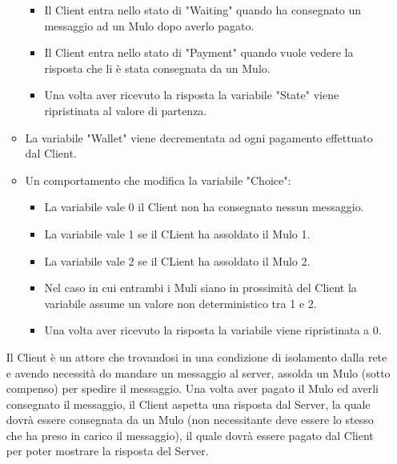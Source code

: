 \documentclass[13pt,a4paper]{article}
\begin{document}
\begin{itemize}
\begin{itemize}
\begin{itemize}
							\item Il Client entra nello stato di "Waiting" quando ha consegnato un messaggio ad un Mulo dopo averlo pagato. 
							\item Il Client entra nello stato di "Payment" quando vuole vedere la risposta che li è stata consegnata da un Mulo.
							\item Una volta aver ricevuto la risposta la variabile "State" viene ripristinata al valore di partenza.
							\end{itemize}
						\item La variabile "Wallet" viene decrementata ad ogni pagamento effettuato dal Client.
						\item Un comportamento che modifica la variabile "Choice":
						\begin{itemize}
							\item La variabile vale 0 il Client non ha consegnato nessun messaggio.
							\item La variabile vale 1 se  il CLient ha assoldato il Mulo 1.
							\item La variabile vale 2 se  il CLient ha assoldato il Mulo 2.
							\item Nel caso in cui entrambi i Muli siano in prossimità del Client la variabile assume un valore non deterministico tra 1 e 2.
							\item Una volta aver ricevuto la risposta la variabile viene ripristinata a 0.
						\end{itemize}
					\end{itemize}
				Il Client  è un attore che trovandosi in una condizione di isolamento dalla rete e avendo necessità do mandare un messaggio al server, assolda un Mulo (sotto compenso) per spedire il messaggio. Una volta aver pagato il Mulo ed averli consegnato il messaggio, il Client aspetta una risposta dal Server, la quale dovrà essere consegnata da un Mulo (non necessitante deve essere lo stesso che ha preso in carico il messaggio), il quale dovrà essere pagato dal Client per poter mostrare la risposta del Server.
				

\end{itemize}
\end{document}

